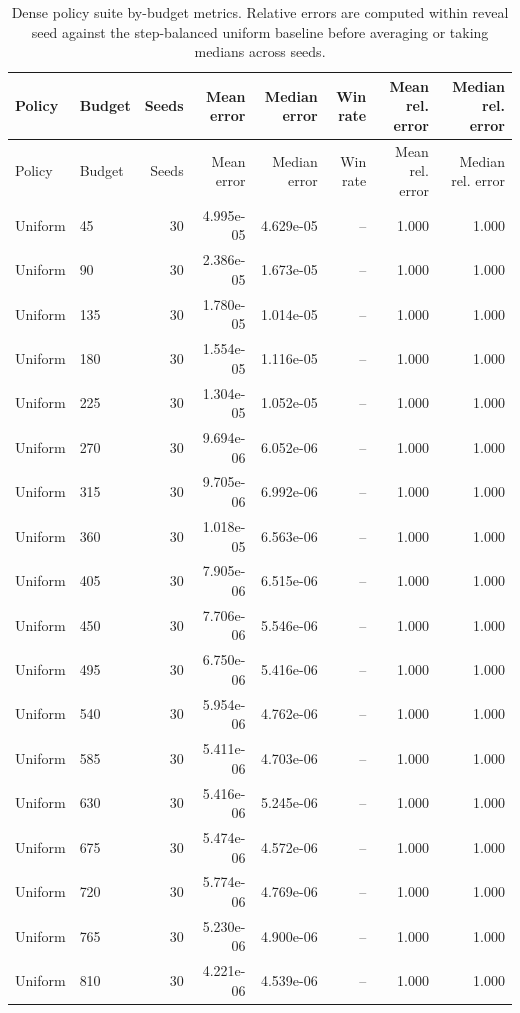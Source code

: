 \begin{scriptsize}
\begin{longtable}{llrrrrrr}
\caption{Dense policy suite by-budget metrics. Relative errors are computed within reveal seed against the step-balanced uniform baseline before averaging or taking medians across seeds.}\label{tab:dense-policy-suite-by-budget-metrics}\\
\toprule
Policy & Budget & Seeds & Mean error & Median error & Win rate & Mean rel. error & Median rel. error \\
\midrule
\endfirsthead
\toprule
Policy & Budget & Seeds & Mean error & Median error & Win rate & Mean rel. error & Median rel. error \\
\midrule
\endhead
Uniform & 45 & 30 & 4.995e-05 & 4.629e-05 & -- & 1.000 & 1.000 \\
Uniform & 90 & 30 & 2.386e-05 & 1.673e-05 & -- & 1.000 & 1.000 \\
Uniform & 135 & 30 & 1.780e-05 & 1.014e-05 & -- & 1.000 & 1.000 \\
Uniform & 180 & 30 & 1.554e-05 & 1.116e-05 & -- & 1.000 & 1.000 \\
Uniform & 225 & 30 & 1.304e-05 & 1.052e-05 & -- & 1.000 & 1.000 \\
Uniform & 270 & 30 & 9.694e-06 & 6.052e-06 & -- & 1.000 & 1.000 \\
Uniform & 315 & 30 & 9.705e-06 & 6.992e-06 & -- & 1.000 & 1.000 \\
Uniform & 360 & 30 & 1.018e-05 & 6.563e-06 & -- & 1.000 & 1.000 \\
Uniform & 405 & 30 & 7.905e-06 & 6.515e-06 & -- & 1.000 & 1.000 \\
Uniform & 450 & 30 & 7.706e-06 & 5.546e-06 & -- & 1.000 & 1.000 \\
Uniform & 495 & 30 & 6.750e-06 & 5.416e-06 & -- & 1.000 & 1.000 \\
Uniform & 540 & 30 & 5.954e-06 & 4.762e-06 & -- & 1.000 & 1.000 \\
Uniform & 585 & 30 & 5.411e-06 & 4.703e-06 & -- & 1.000 & 1.000 \\
Uniform & 630 & 30 & 5.416e-06 & 5.245e-06 & -- & 1.000 & 1.000 \\
Uniform & 675 & 30 & 5.474e-06 & 4.572e-06 & -- & 1.000 & 1.000 \\
Uniform & 720 & 30 & 5.774e-06 & 4.769e-06 & -- & 1.000 & 1.000 \\
Uniform & 765 & 30 & 5.230e-06 & 4.900e-06 & -- & 1.000 & 1.000 \\
Uniform & 810 & 30 & 4.221e-06 & 4.539e-06 & -- & 1.000 & 1.000 \\

\end{longtable}
\end{scriptsize}
